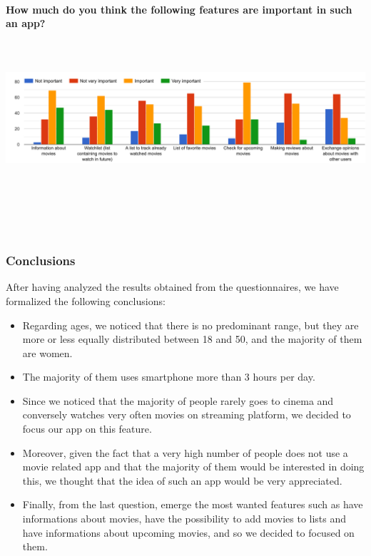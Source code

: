 \documentclass[12pt, a4paper]{article}
\begin{document}
\paragraph{How much do you think the following features are important in such an app?}\mbox{}\\\\
\includegraphics[width=1\textwidth]{Images/features.png}\\\\\\\\\\\\

\subsubsection{Conclusions}
After having analyzed the results obtained from the questionnaires, we have formalized the following conclusions:
\begin{itemize}
	\item Regarding ages, we noticed that there is no predominant range, but they are more or less equally distributed between 18 and 50, and the majority of them are women.
	\item The majority of them uses smartphone more than 3 hours per day.
	\item Since we noticed that the majority of people rarely goes to cinema and conversely watches very often movies on streaming platform, we decided to focus our app on this feature.
	\item Moreover, given the fact that a very high number of people does not use a movie related app and that the majority of them would be interested in doing this, we thought that the idea of such an app would be very appreciated.
	\item Finally, from the last question, emerge the most wanted features such as have informations about movies, have the possibility to add movies to lists and have informations about upcoming movies, and so we decided to focused on them.
\end{itemize}
\end{document}
